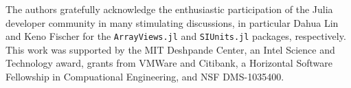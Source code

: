 \documentclass[preprint]{sigplanconf}
\newcommand{\code}[1]{\texttt{#1}}
\begin{document}
%

\acks

The authors gratefully acknowledge the enthusiastic participation of the Julia
developer community in many stimulating discussions, in particular Dahua Lin and
Keno Fischer for the \code{ArrayViews.jl}\cite{Lin:2014av} and
\code{SIUnits.jl}\cite{Fischer:2014si} packages, respectively. This
work was supported by the MIT Deshpande Center, an Intel Science and
Technology award, grants from VMWare and Citibank, a Horizontal Software
Fellowship in Compuational Engineering, and NSF DMS-1035400.


{}





\end{document}

